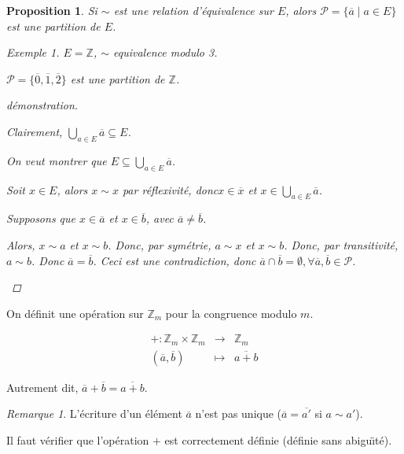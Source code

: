 \documentclass{report}
\newcommand*{\entiers}{\mathbb{Z}}
\newtheorem*{prop}{Proposition}
\theoremstyle{definition}
\theoremstyle{remark}
\newtheorem*{exem}{Exemple}
\newtheorem*{rema}{Remarque}
\begin{document}
	\begin{prop}
		Si $\sim$ est une relation d'\'equivalence sur $E$, alors $\mathcal{P} = \{\overline{a} \mid a \in E\}$ est une partition de $E$.
		\begin{exem}
			$E = \entiers$, $\sim$ equivalence modulo 3.

			$\mathcal{P} = \{\overline{0}, \overline{1}, \overline{2}\}$ est une partition de $\entiers$.
		\end{exem}
		\begin{proof}[d\'emonstration]~

			\begin{nlist}
				\item Clairement, $\bigcup\limits_{a \in E}\overline{a} \subseteq E$.

				On veut montrer que $E \subseteq \bigcup\limits_{a \in E}\overline{a}$.

				Soit $x \in E$, alors $x \sim x$ par r\'eflexivit\'e, donc$x \in \overline{x}$ et $x \in \bigcup\limits_{a \in E}\overline{a}$.
				\item Supposons que $x \in \overline{a}$ et $x \in \overline{b}$, avec $\overline{a} \neq \overline{b}$.

				Alors, $x \sim a$ et $x \sim b$. Donc, par sym\'etrie, $a \sim x$ et $x \sim b$. Donc, par transitivit\'e, $a \sim b$. Donc $\overline{a} = \overline{b}$. Ceci est une contradiction, donc $\overline{a} \cap \overline{b} = \emptyset, \forall \overline{a}, \overline{b} \in \mathcal{P}$.
			\end{nlist}
		\end{proof}
	\end{prop}

	On d\'efinit une op\'eration sur $\entiers_m$ pour la congruence modulo $m$.

	\[
	\begin{array}{rcl}
		+:\entiers_m \times \entiers_m& \to& \entiers_m\\
		(\overline{a}, \overline{b})& \mapsto& \overline{a+b}
	\end{array}
	\]

	Autrement dit, $\overline{a} + \overline{b} = \overline{a+b}$.
	\begin{rema}
		L'\'ecriture d'un \'el\'ement $\overline{a}$ n'est pas unique ($\overline{a} = \overline{a'}$ si $a \sim a'$).
	\end{rema}

	Il faut v\'erifier que l'op\'eration $+$ est correctement d\'efinie (d\'efinie sans abigu\"\i t\'e).
\end{document}
